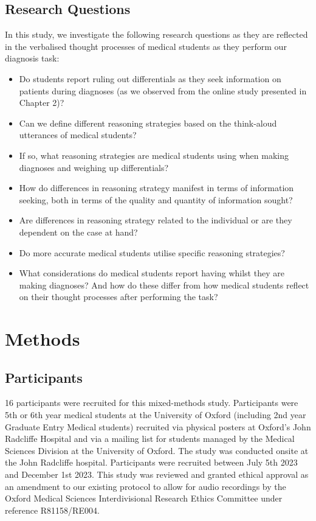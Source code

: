 \documentclass[a4paper, nobind]{templates/ociamthesis}
\providecommand{\tightlist}{%
  \setlength{\itemsep}{0pt}\setlength{\parskip}{0pt}}
\begin{document}
\subsection*{Research Questions}\label{research-questions-1}

In this study, we investigate the following research questions as they are reflected in the verbalised thought processes of medical students as they perform our diagnosis task:

\begin{itemize}
\tightlist
\item
  Do students report ruling out differentials as they seek information on patients during diagnoses (as we observed from the online study presented in Chapter 2)?
\item
  Can we define different reasoning strategies based on the think-aloud utterances of medical students?
\item
  If so, what reasoning strategies are medical students using when making diagnoses and weighing up differentials?
\item
  How do differences in reasoning strategy manifest in terms of information seeking, both in terms of the quality and quantity of information sought?
\item
  Are differences in reasoning strategy related to the individual or are they dependent on the case at hand?
\item
  Do more accurate medical students utilise specific reasoning strategies?
\item
  What considerations do medical students report having whilst they are making diagnoses? And how do these differ from how medical students reflect on their thought processes after performing the task?
\end{itemize}

\section*{Methods}\label{methods-2}

\subsection*{Participants}\label{participants-1}

16 participants were recruited for this mixed-methods study. Participants were 5th or 6th year medical students at the University of Oxford (including 2nd year Graduate Entry Medical students) recruited via physical posters at Oxford's John Radcliffe Hospital and via a mailing list for students managed by the Medical Sciences Division at the University of Oxford. The study was conducted onsite at the John Radcliffe hospital. Participants were recruited between July 5th 2023 and December 1st 2023. This study was reviewed and granted ethical approval as an amendment to our existing protocol to allow for audio recordings by the Oxford Medical Sciences Interdivisional Research Ethics Committee under reference R81158/RE004.
\end{document}
